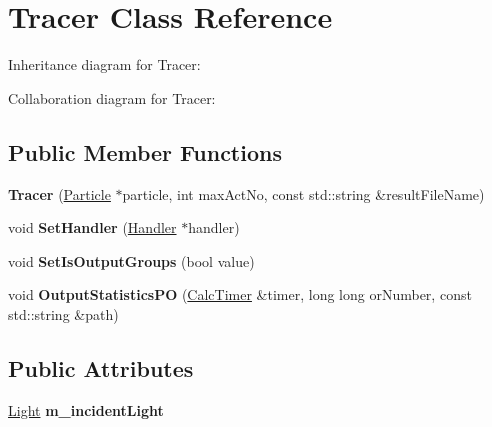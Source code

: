 \hypertarget{class_tracer}{}\section{Tracer Class Reference}
\label{class_tracer}


Inheritance diagram for Tracer\+:


Collaboration diagram for Tracer\+:
\subsection*{Public Member Functions}
\begin{DoxyCompactItemize}
\item 
\mbox{\label{class_tracer_ab99221c418f17833ac39c5d7d35936bd}} 
{\bfseries Tracer} (\mbox{\hyperlink{class_particle}{Particle}} $\ast$particle, int max\+Act\+No, const std\+::string \&result\+File\+Name)
\item 
\mbox{\label{class_tracer_a7c7f40458880967ff1cd9ca8e265eeaa}} 
void {\bfseries Set\+Handler} (\mbox{\hyperlink{class_handler}{Handler}} $\ast$handler)
\item 
\mbox{\label{class_tracer_ac78ce79d165b541348b8eb250a325e38}} 
void {\bfseries Set\+Is\+Output\+Groups} (bool value)
\item 
\mbox{\label{class_tracer_a85c4978cd9b9d38ee25d489f9358e2bc}} 
void {\bfseries Output\+Statistics\+PO} (\mbox{\hyperlink{class_calc_timer}{Calc\+Timer}} \&timer, long long or\+Number, const std\+::string \&path)
\end{DoxyCompactItemize}
\subsection*{Public Attributes}
\begin{DoxyCompactItemize}
\item 
\mbox{\label{class_tracer_ae325f44ed4a3f6c84c7800d34cdb09ef}} 
\mbox{\hyperlink{class_light}{Light}} {\bfseries m\+\_\+incident\+Light}
\end{DoxyCompactItemize}
